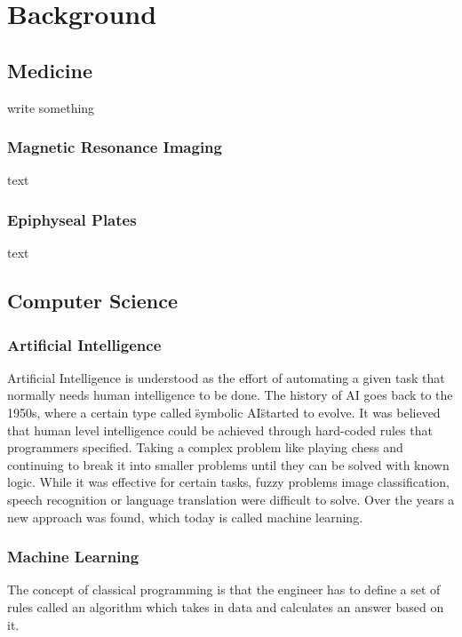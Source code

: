 \section{Background}

\subsection{Medicine}

write something

\subsubsection{Magnetic Resonance Imaging}

text

\subsubsection{Epiphyseal Plates}

text

\subsection{Computer Science}

\subsubsection{Artificial Intelligence}

Artificial Intelligence is understood as the effort of automating a given task that normally needs human intelligence to be done. The history of AI goes back to the 1950s, where a certain type called \"symbolic AI\" started to evolve. It was believed that human level intelligence could be achieved through hard-coded rules that programmers specified. Taking a complex problem like playing chess and continuing to break it into smaller problems until they can be solved with known logic. While it was effective for certain tasks,  fuzzy problems image classification, speech recognition or language translation were difficult to solve. Over the years a new approach was found, which today is called machine learning.

\subsubsection{Machine Learning}

The concept of classical programming is that the engineer has to define a set of rules called an algorithm which takes in data and calculates an answer based on it.

